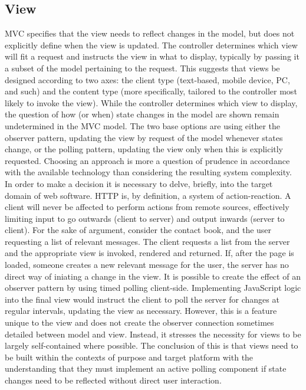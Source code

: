 \subsection{View}
MVC specifies that the view needs to reflect changes in the model, but does not explicitly define when the view is updated.
The controller determines which view will fit a request and instructs the view in what to display, typically by passing it a subset of the model pertaining to the request. This suggests that views be designed according to two axes: the client type (text-based, mobile device, PC, and such) and the content type (more specifically, tailored to the controller most likely to invoke the view). While the controller determines which view to display, the question of how (or when) state changes in the model are shown remain undetermined in the MVC model. The two base options are using either the observer pattern, updating the view by request of the model whenever states change, or the polling pattern, updating the view only when this is explicitly requested. Choosing an approach is more a question of prudence in accordance with the available technology than considering the resulting system complexity. In order to make a decision it is necessary to delve, briefly, into the target domain of web software. HTTP is, by definition, a system of action-reaction. A client will never be affected to perform actions from remote sources, effectively limiting input to go outwards (client to server) and output inwards (server to client).
For the sake of argument, consider the contact book, and the user requesting a list of relevant messages. The client requests a list from the server and the appropriate view is invoked, rendered and returned. If, after the page is loaded, someone creates a new relevant message for the user, the server has no direct way of iniating a change in the view.
It is possible to create the effect of an observer pattern by using timed polling client-side. Implementing JavaScript logic into the final view would instruct the client to poll the server for changes at regular intervals, updating the view as necessary. However, this is a feature unique to the view and does not create the observer connection sometimes detailed between model and view. Instead, it stresses the necessity for views to be largely self-contained where possible.
The conclusion of this is that views need to be built within the contexts of purpose and target platform with the understanding that they must implement an active polling component if state changes need to be reflected without direct user interaction.

